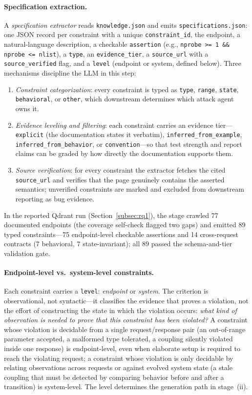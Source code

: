 \documentclass[acmsmall,screen,review,anonymous]{acmart}
\begin{document}
\paragraph{Specification extraction.}
A \emph{specification extractor} reads \texttt{knowledge.json} and emits \texttt{specifications.json}: one JSON record per constraint with a unique \texttt{constraint\_id}, the endpoint, a natural-language description, a checkable \texttt{assertion} (e.g., \texttt{nprobe >= 1 \&\& nprobe <= nlist}), a \texttt{type}, an \texttt{evidence\_tier}, a \texttt{source\_url} with a \texttt{source\_verified} flag, and a \texttt{level} (endpoint or system, defined below). Three mechanisms discipline the LLM in this step:
\begin{enumerate}
  \item \emph{Constraint categorization}: every constraint is typed as \texttt{type}, \texttt{range}, \texttt{state}, \texttt{behavioral}, or \texttt{other}, which downstream determines which attack agent owns it.
  \item \emph{Evidence leveling and filtering}: each constraint carries an evidence tier---\texttt{explicit} (the documentation states it verbatim), \texttt{inferred\_from\_example}, \texttt{inferred\_from\_behavior}, or \texttt{convention}---so that test strength and report claims can be graded by how directly the documentation supports them.
  \item \emph{Source verification}: for every constraint the extractor fetches the cited \texttt{source\_url} and verifies that the page genuinely contains the asserted semantics; unverified constraints are marked and excluded from downstream reporting as bug evidence.
\end{enumerate}
In the reported Qdrant run (Section~\ref{subsec:rq1}), the stage crawled 77 documented endpoints (the coverage self-check flagged two gaps) and emitted 89 typed constraints---75 endpoint-level checkable assertions and 14 cross-request contracts (7 behavioral, 7 state-invariant); all 89 passed the schema-and-tier validation gate.

\paragraph{Endpoint-level vs.\ system-level constraints.}
Each constraint carries a \texttt{level}: \emph{endpoint} or \emph{system}. The criterion is observational, not syntactic---it classifies the evidence that proves a violation, not the effort of constructing the state in which the violation occurs: \emph{what kind of observation is needed to prove that this constraint has been violated?} A constraint whose violation is decidable from a single request/response pair (an out-of-range parameter accepted, a malformed type tolerated, a coupling silently violated inside one response) is endpoint-level, even when elaborate setup is required to reach the violating request; a constraint whose violation is only decidable by relating observations across requests or against evolved system state (a stale coupling that must be detected by comparing behavior before and after a transition) is system-level. The level determines the generation path in stage~(ii).
\end{document}
